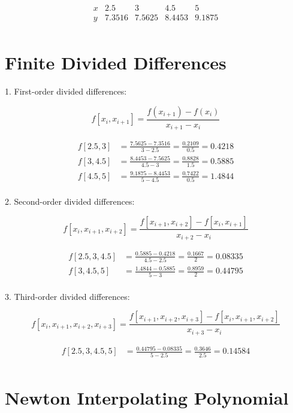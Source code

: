 \documentclass[12pt]{article}
\begin{document}
\[
\begin{array}{c|cccc}
x & 2.5 & 3 & 4.5 & 5 \\
\hline
y & 7.3516 & 7.5625 & 8.4453 & 9.1875 \\
\end{array}
\]

\section*{Finite Divided Differences}

1. First-order divided differences:

\[
f[x_i, x_{i+1}] = \frac{f(x_{i+1}) - f(x_i)}{x_{i+1} - x_i}
\]

\[
\begin{aligned}
f[2.5, 3] &= \frac{7.5625 - 7.3516}{3 - 2.5} = \frac{0.2109}{0.5} = 0.4218 \\
f[3, 4.5] &= \frac{8.4453 - 7.5625}{4.5 - 3} = \frac{0.8828}{1.5} = 0.5885 \\
f[4.5, 5] &= \frac{9.1875 - 8.4453}{5 - 4.5} = \frac{0.7422}{0.5} = 1.4844 \\
\end{aligned}
\]

2. Second-order divided differences:

\[
f[x_i, x_{i+1}, x_{i+2}] = \frac{f[x_{i+1}, x_{i+2}] - f[x_i, x_{i+1}]}{x_{i+2} - x_i}
\]

\[
\begin{aligned}
f[2.5, 3, 4.5] &= \frac{0.5885 - 0.4218}{4.5 - 2.5} = \frac{0.1667}{2} = 0.08335 \\
f[3, 4.5, 5] &= \frac{1.4844 - 0.5885}{5 - 3} = \frac{0.8959}{2} = 0.44795 \\
\end{aligned}
\]

3. Third-order divided differences:

\[
f[x_i, x_{i+1}, x_{i+2}, x_{i+3}] = \frac{f[x_{i+1}, x_{i+2}, x_{i+3}] - f[x_i, x_{i+1}, x_{i+2}]}{x_{i+3} - x_i}
\]

\[
\begin{aligned}
f[2.5, 3, 4.5, 5] &= \frac{0.44795 - 0.08335}{5 - 2.5} = \frac{0.3646}{2.5} = 0.14584 \\
\end{aligned}
\]

\section*{Newton Interpolating Polynomial}
\end{document}
